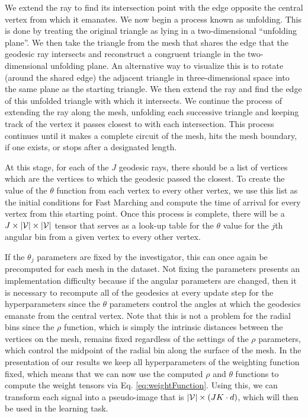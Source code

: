 \documentclass{article}
\DeclarePairedDelimiter\abs{\lvert}{\rvert}\DeclarePairedDelimiter\norm{\lVert}{\rVert}\newcommand{\p}[1]{\left(#1\right)}
\begin{document}
We extend the ray to find its intersection point with the edge opposite the central vertex from which it emanates. We now begin a process known as unfolding. This is done by treating the original triangle as lying in a two-dimensional ``unfolding plane''. We then take the triangle from the mesh that shares the edge that the geodesic ray intersects and reconstruct a congruent triangle in the two-dimensional unfolding plane. An alternative way to visualize this is to rotate (around the shared edge) the adjacent triangle in three-dimensional space into the same plane as the starting triangle. We then extend the ray and find the edge of this unfolded triangle with which it intersects. We continue the process of extending the ray along the mesh, unfolding each successive triangle and keeping track of the vertex it passes closest to with each intersection. This process continues until it makes a complete circuit of the mesh, hits the mesh boundary, if one exists, or stops after a designated length.

At this stage, for each of the $J$ geodesic rays, there should be a list of vertices which are the vertices to which the geodesic passed the closest. To create the value of the $\theta$ function from each vertex to every other vertex, we use this list as the initial conditions for Fast Marching and compute the time of arrival for every vertex from this starting point. Once this process is complete, there will be a $J \times \abs{\mathcal{V}} \times \abs{\mathcal{V}}$ tensor that serves as a look-up table for the $\theta$ value for the $j$th angular bin from a given vertex to every other vertex.

If the $\theta_j$ parameters are fixed by the investigator, this can once again be precomputed for each mesh in the dataset. Not fixing the parameters presents an implementation difficulty because if the angular parameters are changed, then it is necessary to recompute all of the geodesics at every update step for the hyperparameters since the $\theta$ parameters control the angles at which the geodesics emanate from the central vertex. Note that this is not a problem for the radial bins since the $\rho$ function, which is simply the intrinsic distances between the vertices on the mesh, remains fixed regardless of the settings of the $\rho$ parameters, which control the midpoint of the radial bin along the surface of the mesh. In the presentation of our results we keep all hyperparameters of the weighting function fixed, which means that we can now use the computed $\rho$ and $\theta$ functions to compute the weight tensors via Eq. \eqref{eq:weightFunction}. Using this, we can transform each signal into a pseudo-image that is $\abs{\mathcal{V}} \times (JK \cdot d)$, which will then be used in the learning task.
\fi
\end{document}
